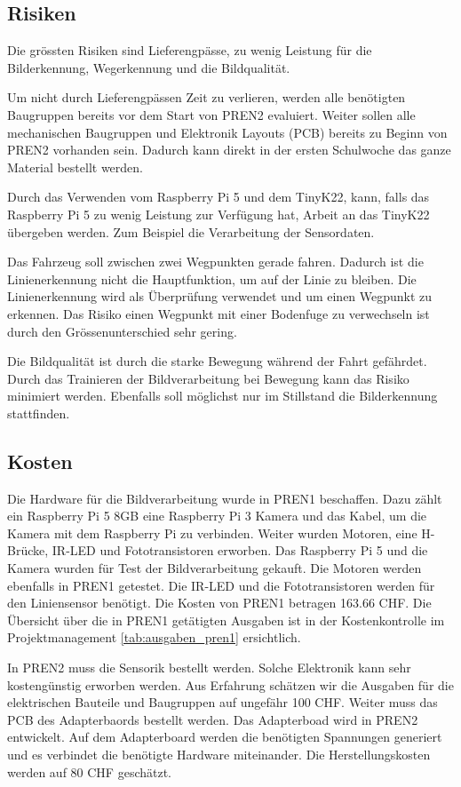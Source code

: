\documentclass[../main.tex]{subfiles}
\begin{document}
\newpage
\subsection{Risiken}
Die grössten Risiken sind Lieferengpässe, zu wenig Leistung für die Bilderkennung, Wegerkennung und die Bildqualität. 

Um nicht durch Lieferengpässen Zeit zu verlieren, werden alle benötigten Baugruppen bereits vor dem Start von PREN2 evaluiert. Weiter sollen alle mechanischen Baugruppen und Elektronik Layouts (PCB) bereits zu Beginn von PREN2 vorhanden sein. Dadurch kann direkt in der ersten Schulwoche das ganze Material bestellt werden.

Durch das Verwenden vom Raspberry Pi 5 und dem TinyK22, kann, falls das Raspberry Pi 5 zu wenig Leistung zur Verfügung hat, Arbeit an das TinyK22 übergeben werden. Zum Beispiel die Verarbeitung der Sensordaten. 

Das Fahrzeug soll zwischen zwei Wegpunkten gerade fahren. Dadurch ist die Linienerkennung nicht die Hauptfunktion, um auf der Linie zu bleiben. Die Linienerkennung wird als Überprüfung verwendet und um einen Wegpunkt zu erkennen. Das Risiko einen Wegpunkt mit einer Bodenfuge zu verwechseln ist durch den Grössenunterschied sehr gering. 

Die Bildqualität ist durch die starke Bewegung während der Fahrt gefährdet. Durch das Trainieren der Bildverarbeitung bei Bewegung kann das Risiko minimiert werden. Ebenfalls soll möglichst nur im Stillstand die Bilderkennung stattfinden. 

\subsection{Kosten}
Die Hardware für die Bildverarbeitung wurde in PREN1 beschaffen. Dazu zählt ein Raspberry Pi 5 8GB eine Raspberry Pi 3 Kamera und das Kabel, um die Kamera mit dem Raspberry Pi zu verbinden. Weiter wurden Motoren, eine H-Brücke, IR-LED und Fototransistoren erworben. Das Raspberry Pi 5 und die Kamera wurden für Test der Bildverarbeitung gekauft. Die Motoren werden ebenfalls in PREN1 getestet. Die IR-LED und die Fototransistoren werden für den Liniensensor benötigt. Die Kosten von PREN1 betragen 163.66 CHF. Die Übersicht über die in PREN1 getätigten Ausgaben ist in der Kostenkontrolle im Projektmanagement \ref{tab:ausgaben_pren1} ersichtlich. 

In PREN2 muss die Sensorik bestellt werden. Solche Elektronik kann sehr kostengünstig erworben werden. Aus Erfahrung schätzen wir die Ausgaben für die elektrischen Bauteile und Baugruppen auf ungefähr 100 CHF. Weiter muss das PCB des Adapterbaords bestellt werden. Das Adapterboad wird in PREN2 entwickelt. Auf dem Adapterboard werden die benötigten Spannungen generiert und es verbindet die benötigte Hardware miteinander. Die Herstellungskosten werden auf 80 CHF geschätzt.
\end{document}

